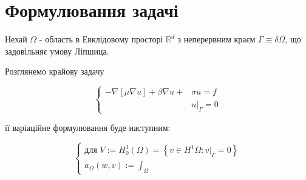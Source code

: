 
\section{Формулювання задачі}

Нехай $\Omega$ - область в Евклідовому просторі $\mathbb{R}^d$ з неперервним краєм $\Gamma \equiv \delta \Omega$, що задовільняє умову Ліпшица.

Розглянемо крайову задачу

\begin{equation}\label{eq:general_boundary}
	\begin{cases}
			- \nabla [\mu \nabla u] + \beta \nabla u + &\sigma u = f  \\
			&u|_\Gamma = 0
	\end{cases}
\end{equation}

її варіаційне формулювання буде наступним:

\begin{equation}\label{eq:general_variational}
	\begin{cases}
		\mbox{для } V := H_0^1 \left( \Omega \right) = 
		\left\lbrace 
			v \in H^1 \Omega : v|_\Gamma = 0
		\right\rbrace \\
		
		a_\Omega(w,v) := \int_\Omega
		
	\end{cases}
\end{equation}
